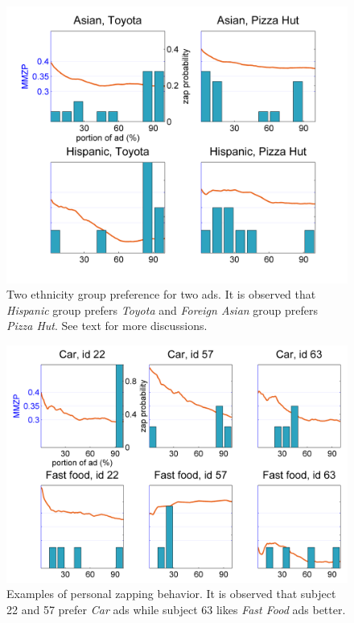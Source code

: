 \documentclass[10pt,journal,cspaper,compsoc]{IEEEtran}
\begin{document}
\begin{figure}[t]
	\centering
		\includegraphics[width=\columnwidth]{fig/eth_ad.png}
	\caption{Two ethnicity group preference for two ads. It is observed that \textit{Hispanic} group prefers \textit{Toyota} and \textit{Foreign Asian} group prefers \textit{Pizza Hut}. See text for more discussions.}
	\label{fig:eth_ad}
\end{figure}

\begin{figure}[t]
	\centering
		\includegraphics[width=\columnwidth]{fig/adcat_id.png}
	\caption{Examples of personal zapping behavior. It is observed that subject 22 and 57 prefer \textit{Car} ads while subject 63 likes \textit{Fast Food} ads better.}
	\label{fig:adcat_id}
\end{figure}
\end{document}
